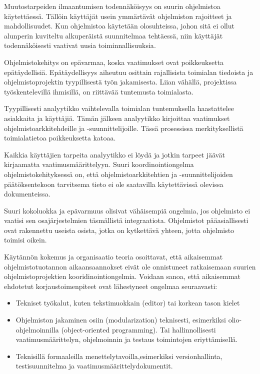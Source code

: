 \documentclass[finnish]{tktltiki2}
\theoremstyle{definition}
\theoremstyle{remark}
\begin{document}
Muutostarpeiden ilmaantumisen todennäköisyys on suurin ohjelmistoa käytettäessä. Tällöin käyttäjät usein ymmärtävät ohjelmiston rajoitteet ja mahdollisuudet. Kun ohjelmistoa käytetään olosuhteissa, johon sitä ei ollut alunperin kuviteltu alkuperäistä suunnitelmaa tehtäessä, niin käyttäjät todennäköisesti vaativat uusia toiminnallisuuksia\cite{KES95}.

Ohjelmistokehitys on epävarmaa, koska vaatimukset ovat poikkeuksetta epätäydellisiä. Epätäydellisyys aiheutuu osittain rajallisista toimialan tiedoista ja ohjelmistoprojektin tyypillisestä työn jakamisesta. Liian vähällä, projektissa työskentelevillä ihmisillä, on riittävää tuntemusta toimialasta\cite{KES95}.

Tyypillisesti analyytikko vaihtelevalla toimialan tuntemuksella haastattelee asiakkaita ja käyttäjiä. Tämän jälkeen analyytikko kirjoittaa vaatimukset ohjelmistoarkkitehdeille ja -suunnittelijoille. Tässä prosessissa merkityksellistä toimialatietoa poikkeuksetta katoaa\cite{KES95}.

Kaikkia käyttäjien tarpeita analyytikko ei löydä ja jotkin tarpeet jäävät kirjaamatta vaatimusmäärittelyyn. Suuri koordinointiongelma ohjelmistokehityksessä on, että ohjelmistoarkkitehtien ja -suunnittelijoiden päätöksentekoon tarvitsema tieto ei ole saatavilla käytettävissä olevissa dokumenteissa\cite{KES95}.

Suuri kokoluokka ja epävarmuus olisivat vähäisempiä ongelmia, jos ohjelmisto ei vaatisi sen osajärjestelmien täsmällistä integraatiota. Ohjelmistot pääasiallisesti ovat rakennettu useista osista, jotka on kytkettävä yhteen, jotta ohjelmisto toimisi oikein\cite{KES95}.

Käytännön kokemus ja organisaatio teoria osoittavat, että aikaisemmat ohjelmistotuotannon aikaansaannokset eivät ole onnistuneet ratkaisemaan suurien ohjelmistoprojektien kooridinointiongelmia. 
Voidaan sanoa, että aikaisemmat ehdotetut korjaustoimenpiteet ovat lähestyneet ongelmaa seuraavasti: 
\begin{itemize}
 \item Tekniset työkalut, kuten tekstimuokkain (editor) tai korkean tason kielet
 \item Ohjelmiston jakaminen osiin (modularization) teknisesti, esimerkiksi olio-ohjelmoinnilla (object-oriented programming). Tai hallinnollisesti vaatimusmäärittelyn, ohjelmoinnin ja testaus toimintojen eriyttämisellä.
 \item Teknisillä formaaleilla menettelytavoilla,esimerkiksi versionhallinta, testisuunnitelma ja vaatimusmäärittelydokumentit\cite{KES95}.
\end{itemize}
\end{document}
